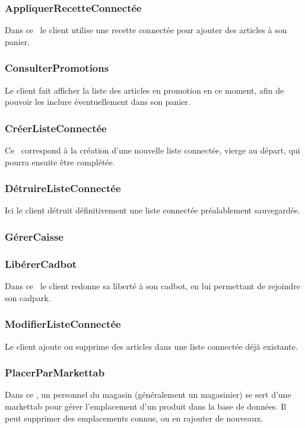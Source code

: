\subsubsection{AppliquerRecetteConnectée}
Dans ce  \cu\ le client utilise une recette connectée pour ajouter des articles à son panier.

\subsubsection{ConsulterPromotions}
Le client fait afficher la liste des articles en promotion en ce moment, afin de pouvoir les inclure éventuellement dans son panier.

\subsubsection{CréerListeConnectée}
Ce \cu\ correspond à la création d'une nouvelle liste connectée, vierge au départ, qui pourra ensuite être complétée.

\subsubsection{DétruireListeConnectée}
Ici le client détruit définitivement une liste connectée préalablement sauvegardée.

\subsubsection{GérerCaisse}
\TODO

\subsubsection{LibérerCadbot}
Dans ce \cu\ le client redonne sa liberté à son cadbot, en lui permettant de rejoindre son cadpark.

\subsubsection{ModifierListeConnectée}
Le client ajoute ou supprime des articles dans une liste connectée déjà existante.

\subsubsection{PlacerParMarkettab}
Dans ce \cu, un personnel du magasin (généralement un magasinier) se sert d'une markettab pour gérer l'emplacement d'un produit dans la base de données.
Il peut supprimer des emplacements connus, ou en rajouter de nouveaux.

